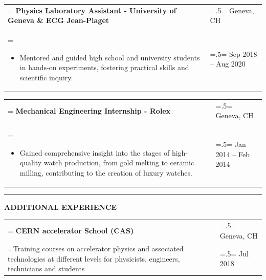 \documentclass[letterpaper, 11pt]{article}
\begin{document}
\begin{tabularx}{1.0\textwidth} { 
   >{\raggedright\arraybackslash\hsize=1.5\hsize\linewidth=\hsize}X 
   >{\raggedleft\arraybackslash\hsize=.5\hsize\linewidth=\hsize}X }
\normalsize
\bf{Physics Laboratory Assistant - University of Geneva \& ECG Jean-Piaget} & Geneva, CH\\
\normalfont \begin{itemize}[leftmargin=*,noitemsep,topsep=0pt]
\item Mentored and guided high school and university students in hands-on experiments, fostering practical skills and scientific inquiry.
\end{itemize} & Sep 2018 -- Aug 2020
\end{tabularx}

\begin{tabularx}{1.0\textwidth} { 
   >{\raggedright\arraybackslash\hsize=1.5\hsize\linewidth=\hsize}X 
   >{\raggedleft\arraybackslash\hsize=.5\hsize\linewidth=\hsize}X }
\normalsize
\bf{Mechanical Engineering Internship - Rolex} & Geneva, CH\\
\normalfont \begin{itemize}[leftmargin=*,noitemsep,topsep=0pt]
\item Gained comprehensive insight into the stages of high-quality watch production, from gold melting to ceramic milling, contributing to the creation of luxury watches.
\end{itemize} & Jan 2014 --  Feb 2014
\end{tabularx}


\begin{center}
\noindent\rule{0.75\textwidth}{1pt}
\end{center}

\begin{center}
\large\bf{ADDITIONAL EXPERIENCE}
\end{center}

\begin{tabularx}{1.0\textwidth} { 
   >{\raggedright\arraybackslash\hsize=1.5\hsize\linewidth=\hsize}X 
   >{\raggedleft\arraybackslash\hsize=.5\hsize\linewidth=\hsize}X }
\normalsize
\bf{CERN accelerator School (CAS)} & Geneva, CH \\
\normalfont Training courses on accelerator physics and associated technologies at different levels for physicists, engineers, technicians and students & Jul 2018
\end{tabularx}
\vspace{0.25cm}
\end{document}
